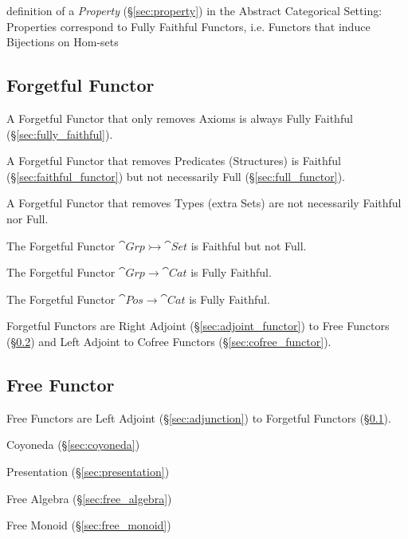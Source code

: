 definition of a \emph{Property} (\S\ref{sec:property}) in the Abstract
Categorical Setting: Properties correspond to Fully Faithful Functors, i.e.
Functors that induce Bijections on Hom-sets



\subsection{Forgetful Functor}\label{sec:forgetful_functor}

A Forgetful Functor that only removes Axioms is always Fully Faithful
(\S\ref{sec:fully_faithful}).

A Forgetful Functor that removes Predicates (Structures) is Faithful
(\S\ref{sec:faithful_functor}) but not necessarily Full
(\S\ref{sec:full_functor}).

A Forgetful Functor that removes Types (extra Sets) are not
necessarily Faithful nor Full.

The Forgetful Functor $\cat{Grp} \rightarrowtail \cat{Set}$ is
Faithful but not Full.

The Forgetful Functor $\cat{Grp} \rightarrow \cat{Cat}$ is
Fully Faithful.

The Forgetful Functor $\cat{Pos} \rightarrow \cat{Cat}$ is
Fully Faithful.

Forgetful Functors are Right Adjoint (\S\ref{sec:adjoint_functor}) to
Free Functors (\S\ref{sec:free_functor}) and Left Adjoint to Cofree
Functors (\S\ref{sec:cofree_functor}).



\subsection{Free Functor}\label{sec:free_functor}

Free Functors are Left Adjoint (\S\ref{sec:adjunction}) to Forgetful
Functors (\S\ref{sec:forgetful_functor}).

Coyoneda (\S\ref{sec:coyoneda})

Presentation (\S\ref{sec:presentation})

Free Algebra (\S\ref{sec:free_algebra})

Free Monoid (\S\ref{sec:free_monoid})

